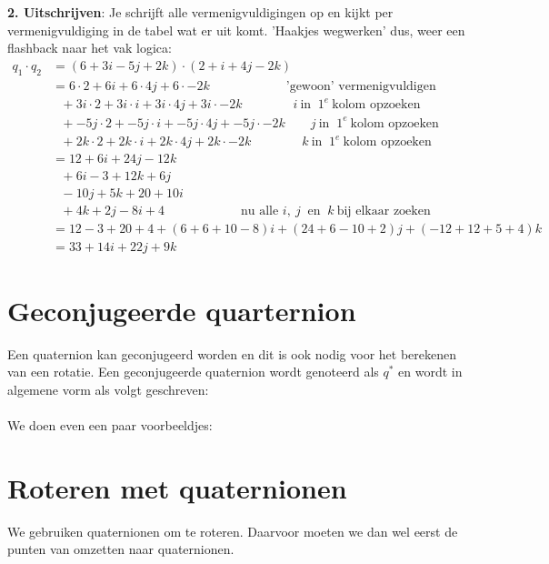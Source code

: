 \newpage
\textbf{2. Uitschrijven}: Je schrijft alle vermenigvuldigingen op en kijkt per vermenigvuldiging in de tabel wat er uit komt. 'Haakjes wegwerken' dus, weer een flashback naar het vak logica:
\begin{align*}
    q_1\cdot q_2 &= (6 + 3i - 5j + 2k) \cdot  (2 + i + 4j - 2k) \\
                 &=   6\cdot 2 + 6i + 6\cdot 4j + 6\cdot -2k \qquad  \qquad \qquad  \text{'gewoon'  vermenigvuldigen}\\
                 & \ \ \ + 3i\cdot 2 + 3i\cdot i + 3i\cdot 4j + 3i\cdot -2k \qquad \qquad  i\  \text{in } \ 1^e \  \text{kolom opzoeken}\\
                 & \ \ \ + -5j\cdot 2 + -5j\cdot i + -5j\cdot 4j + -5j\cdot -2k \qquad j \  \text{in }\ 1^e \ \text{kolom opzoeken}\\
                 & \ \ \ + 2k\cdot 2 + 2k\cdot i + 2k\cdot 4j + 2k\cdot -2k \qquad \qquad k \  \text{in }\ 1^e \ \text{kolom opzoeken}\\
                 &= 12 + 6i + 24j - 12k \\
                 & \ \ \ + 6i - 3 + 12k + 6j \\
                 & \ \ \ -10j + 5k + 20 + 10i \\
                 & \ \ \ + 4k + 2j - 8i + 4 \qquad \qquad \qquad   \text{nu alle } i, \ j \ \text{ en } \ k\ \text{bij elkaar  zoeken}\\
                 &= 12 - 3 + 20 + 4 + (6+6 + 10 -8)i + (24 + 6 - 10 + 2)j + (-12 + 12 + 5 + 4)k \\
                 &= 33 + 14i + 22j + 9k
\end{align*}
\section{Geconjugeerde quarternion}
Een quaternion kan geconjugeerd worden en dit is ook nodig voor het berekenen van een rotatie. Een geconjugeerde quaternion wordt genoteerd als $q^*$ en wordt in algemene vorm als volgt geschreven:
\\ \\
We doen even een paar voorbeeldjes: \\

\section{Roteren met quaternionen}
We gebruiken quaternionen om te roteren. Daarvoor moeten we dan wel eerst de punten van \RD omzetten naar quaternionen.\\

